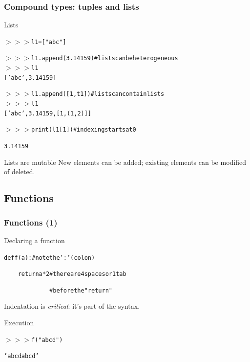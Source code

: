 \documentclass[xcolor=pdftex,dvipsnames,table,mathserif]{beamer}
\begin{document}
\begin{frame}
  \frametitle{Compound types: tuples and lists}

  \begin{block}{Lists}
    \begin{alltt}
      $>>>$ l1=[ "abc" ]

      $>>>$ l1.append(3.14159) \# lists can be heterogeneous
      $>>>$ l1
      [ 'abc', 3.14159 ]

      $>>>$ l1.append( [ 1, t1 ] ) \# lists can contain lists
      $>>>$ l1
      ['abc', 3.14159, [1, (1, 2)]]

      $>>>$ print(l1[1]) \# indexing starts at 0

      3.14159
    \end{alltt}
  \end{block}

\begin{alertblock}{Lists are mutable}
  New elements can  be added; existing elements can be modified of deleted.
\end{alertblock}

\end{frame}

\subsection{Functions}

\begin{frame}
  \frametitle{Functions (1)}

  \begin{block}{Declaring a function}
    \begin{alltt}
      def f(a):        \# note the ':' (colon)

      ~~~~ return a*2   \# there are 4 spaces or 1 tab

      ~~~~ ~~~~ ~~~~ ~\#     before the "return"
    \end{alltt}
  \end{block}

  Indentation is \emph{critical}: it's part of the syntax.


  \begin{block}{Execution}
    \begin{alltt}

      $>>>$ f("abcd")

      'abcdabcd'

    \end{alltt}
  \end{block}

\end{frame}
\end{document}
